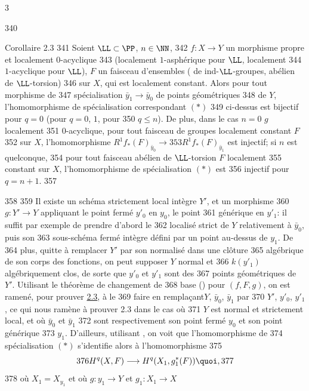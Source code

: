 3	\documentclass[10pt]{../fichiers-configuration-latex/smfart}
\begin{document}
   340	\begin{enonce*}{Corollaire 2.3}
   341	Soient $\LL\subset \PP$, $n\in \NN$,
   342	$f:X\rightarrow Y$ un morphisme propre et localement $0$-acyclique
   343	(\resp localement $1$-asphérique pour $\LL$, \resp localement
   344	$1$-acyclique pour $\LL$), $F$ un faisceau d'ensembles (	de ind-$\LL$-groupes, \resp abélien de $\LL$-torsion)
   346	sur $X$, qui est localement constant. Alors pour tout morphisme de
   347	spécialisation $\bar{y}_1\rightarrow \bar{y}_0$ de points géométriques
   348	de $Y$, l'homomorphisme de spécialisation correspondant $(\ast)$
   349	ci-dessus est bijectif pour $q=0$ (\resp pour $q=0$, $1$, \resp pour
   350	$q\leq n$). De plus, dans le cas $n=0$ \ie $g$ localement
   351	$0$-acyclique, pour tout faisceau de groupes localement constant $F$
   352	sur $X$, l'homomorphisme $R^{1}f_{\ast}(F)_{\bar{y}_0}\rightarrow
   353	R^{1}f_{\ast}(F)_{\bar{y}_1}$ est injectif; si $n$ est quelconque,
   354	pour tout faisceau abélien de $\LL$-torsion $F$ localement
   355	constant sur $X$, l'homomorphisme de spécialisation $(\ast)$ est
   356	injectif pour $q=n+1$.
   357	\end{enonce*}
   358	
   359	Il existe un schéma strictement local intègre $Y'$, et un morphisme
   360	$g:Y'\rightarrow Y$ appliquant le point fermé $y'_0$ en $y_{0}$, le point
   361	générique en $y'_1$: il suffit par exemple de prendre d'abord le
   362	localisé strict de $Y$ relativement à $\bar{y}_0$, puis son
   363	sous-schéma fermé intègre défini par un point au-dessus de $y_1$. De
   364	plus, quitte à remplacer $Y'$ par son normalisé dans une clôture
   365	algébrique de son corps des fonctions, on peut supposer $Y$ normal et
   366	$k(y'_1)$ algébriquement clos, de sorte que $y'_0$ et $y'_1$ sont des
   367	points géométriques de $Y'$. Utilisant le théorème de changement de
   368	base () pour $(f,F,g)$, on est ramené, pour prouver \hyperref[XVI.cor2.3]{2.3}, à le
   369	faire en remplaçant\pageoriginale $Y$, $\bar{y}_0$, $\bar{y}_1$ par
   370	$Y'$, $y'_0$, $y'_1$, ce qui nous ramène à prouver 2.3 dans le cas où
   371	$Y$ est normal et strictement local, et où $\bar{y}_0$ et $\bar{y}_1$
   372	sont respectivement son point fermé $y_0$ et son point générique
   373	$y_1$. D'ailleurs, utilisant , on voit que l'homomorphisme de
   374	spécialisation $(\ast)$ s'identifie alors à l'homomorphisme
   375	$$
   376	H^{q}(X,F)\longrightarrow H^{q}(X_1,g^{\ast}_1(F)){\quoi},
   377	$$
   378	où $X_1=X_{y_1}$ et où $g:y_1\rightarrow Y$ et $g_1:X_1\rightarrow X$
\end{document}
